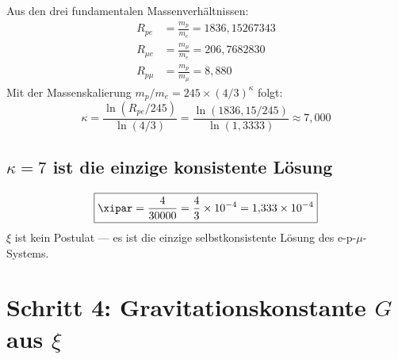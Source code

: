 Aus den drei fundamentalen Massenverhältnissen:
\begin{align}
	R_{pe} &= \frac{m_p}{m_e} = 1836{,}15267343 \\
	R_{\mu e} &= \frac{m_{\mu}}{m_e} = 206{,}7682830 \\
	R_{p\mu} &= \frac{m_p}{m_{\mu}} = 8{,}880
\end{align}
Mit der Massenskalierung $m_p / m_e = 245 \times (4/3)^\kappa$ folgt:
\begin{equation}
	\kappa = \frac{\ln(R_{pe}/245)}{\ln(4/3)} = \frac{\ln(1836{,}15/245)}{\ln(1{,}3333)} \approx 7{,}000
\end{equation}

\subsection{\texorpdfstring{$\kappa = 7$}{kappa = 7} ist die einzige konsistente Lösung}

\begin{table}[h]
\centering
{}
\caption{$\kappa = 7$ ist die einzige konsistente Lösung}
\end{table}

\begin{keyresult}
\begin{equation}
	\boxed{\xipar = \frac{4}{30000} = \frac{4}{3} \times 10^{-4} = 1{,}333 \times 10^{-4}}
\end{equation}
$\xi$ ist kein Postulat — es ist die einzige selbstkonsistente Lösung des e-p-$\mu$-Systems.
\end{keyresult}

\section{Schritt 4: Gravitationskonstante \texorpdfstring{$G$}{G} aus \texorpdfstring{$\xi$}{xi}}

